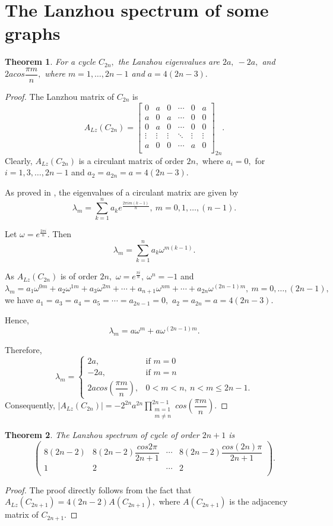 \documentclass[10pt,a4paper,oneside]{article}
\newtheorem{theorem}{Theorem}
\begin{document}
\section{The Lanzhou spectrum of some graphs}\label{4.17}
\begin{theorem}	
	For a cycle $C_{2n},$ the Lanzhou eigenvalues are $2a,\  -2a,$ and $2acos\dfrac{\pi m}{n},$ where $m=1, \ldots, 2n-1$ and $a=4(2n-3).$
\end{theorem}
\begin{proof}
	The Lanzhou matrix of $C_{2n}$ is $$A_{Lz}(C_{2n})=\begin{bmatrix}
		0 & a & 0 &\cdots &0 &a\\
		a & 0 & a &\cdots & 0 & 0\\
		0 & a &0 & \cdots & 0 & 0\\
		\vdots & \vdots & \vdots & \ddots & \vdots& \vdots\\
		a & 0 &0 & \cdots & a & 0\\
	\end{bmatrix}_{2n}.$$
Clearly, $A_{Lz}(C_{2n})$ is a circulant matrix of order $2n,$ where $a_i=0,$ for $i=1,3,\ldots, 2n-1$ and $a_2=a_{2n}=a=4(2n-3).$ 
	
As proved in \cite{17}, the eigenvalues of a circulant matrix are given by	$$ \lambda_m=\sum\limits_{k=1}^{n}a_ke^{\frac{2\pi i m(k-1)}{n}},\ m=0,1,\ldots,(n-1).$$
	
	Let $\omega=e^{\frac{2\pi i}{n}}.$ Then $$ \lambda_m=\sum\limits_{k=1}^{n}a_k\omega^{m(k-1)}.$$
	
	As $A_{Lz}(C_{2n})$ is of order $2n,$ $\omega =e^{\frac{\pi i}{n}},\ \omega^{n}=-1$ and $\lambda_m=a_1\omega^{0m}+a_2\omega^{1m}+a_3\omega^{2m}+\cdots+a_{n+1}\omega^{nm}+\cdots+a_{2n}\omega^{(2n-1)m},\ m=0,\ldots, (2n-1),$ we have $a_1=a_3=a_4=a_5=\cdots=a_{2n-1}=0,$ $a_2=a_{2n}=a=4(2n-3).$ 
	
	Hence,
	$$\lambda_m=a\omega^m+a\omega^{(2n-1)m}.$$ 
	
	Therefore,
	$$\lambda_m =
	\begin{cases} 2a, &\text{if $m=0$ } \\
		-2a, &\text{if $m=n$}\\
		2acos\left(\dfrac{\pi m}{n}\right), &\text{$0<m<n,\ n<m\leq 2n-1$}.
	\end{cases}$$
	Consequently, $\vert A_{Lz}(C_{2n})\vert =-2^{2n}a^{2n}\prod\limits_{\substack{m=1\\m\neq n}}^{2n-1}cos\left(\dfrac{\pi m}{n}\right).$
\end{proof}
\begin{theorem}
	The Lanzhou spectrum of cycle of order $2n+1$ is $$\begin{pmatrix}
		8(2n-2) & 8(2n-2)\dfrac{cos2\pi}{2n+1}& \cdots & 8(2n-2)\dfrac{cos(2n)\pi}{2n+1}\\
		1 & 2& \cdots & 2\\
	\end{pmatrix}.$$
\end{theorem}
\begin{proof}
	The proof directly follows from the fact that $A_{Lz}(C_{2n+1})=4(2n-2)A(C_{2n+1}),$ where $A(C_{2n+1})$ is the adjacency matrix of $C_{2n+1}.$
\end{proof}
\end{document}
